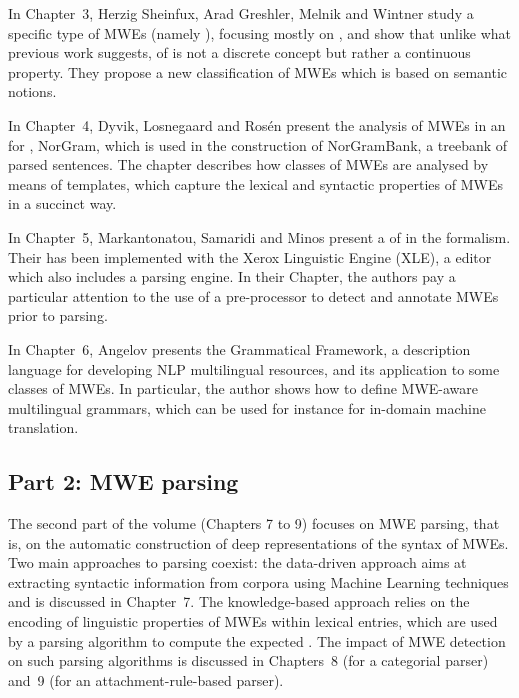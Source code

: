\begin{refsection}
In Chapter~3, {Herzig Sheinfux, Arad Greshler, Melnik and
  Wintner} study a specific type of MWEs (namely ),
focusing mostly on , and show that unlike what previous work
suggests,  of  is not a discrete concept but
rather a continuous property. They propose a new classification of
MWEs which is based on semantic notions.

In Chapter~4, {Dyvik, Losnegaard and Rosén} present the analysis
of MWEs in an   for , NorGram, which is used in the
construction of NorGramBank, a treebank of parsed sentences. The
chapter describes how classes of MWEs are analysed by means of 
templates, which capture the lexical and syntactic properties of MWEs
in a succinct way.

In Chapter~5, {Markantonatou, Samaridi and Minos} present a
 of  in the  formalism. Their  has been
implemented with the Xerox Linguistic Engine (XLE), a  editor
which also includes a parsing engine. In their Chapter, the authors
pay a particular attention to the use of a pre-processor to detect and
annotate MWEs prior to parsing.

In Chapter~6, {Angelov} presents the Grammatical Framework, a
description language for developing NLP multilingual resources, and
its application to some classes of MWEs. In particular, the author
shows how to define MWE-aware multilingual grammars, which can be used
for instance for in-domain machine translation.

\subsection*{Part 2: MWE parsing}

The second part of the volume (Chapters 7 to 9) focuses on MWE
parsing, that is, on the automatic construction of deep
representations of the syntax of MWEs. Two main approaches to parsing
coexist: the data-driven approach aims at extracting syntactic
information from corpora using Machine Learning techniques and is
discussed in Chapter~7. The knowledge-based approach relies on the
encoding of linguistic properties of MWEs within lexical entries,
which are used by a parsing algorithm to compute the
expected . The impact of MWE detection on
such parsing algorithms is discussed in Chapters~8 (for a categorial
parser) and~9 (for an attachment-rule-based parser).


\end{refsection}
